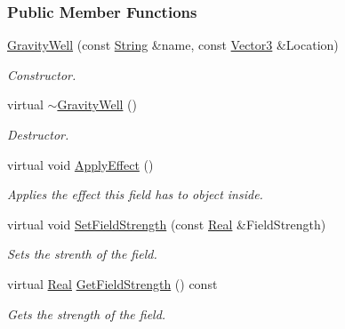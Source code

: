 \subsubsection*{Public Member Functions}
\begin{DoxyCompactItemize}
\item 
\hyperlink{classphys_1_1GravityWell_a628f12b77e5a83a20a51a921d1972e03}{GravityWell} (const \hyperlink{namespacephys_aa03900411993de7fbfec4789bc1d392e}{String} \&name, const \hyperlink{classphys_1_1Vector3}{Vector3} \&Location)
\begin{DoxyCompactList}\small\item\em Constructor. \item\end{DoxyCompactList}\item 
virtual \hyperlink{classphys_1_1GravityWell_aeeeb63ceb3feb1223f8339f73412777d}{$\sim$GravityWell} ()
\begin{DoxyCompactList}\small\item\em Destructor. \item\end{DoxyCompactList}\item 
virtual void \hyperlink{classphys_1_1GravityWell_a944817d495baf9f71b6d33a420eccfde}{ApplyEffect} ()
\begin{DoxyCompactList}\small\item\em Applies the effect this field has to object inside. \item\end{DoxyCompactList}\item 
virtual void \hyperlink{classphys_1_1GravityWell_a2e08c34a70bc57560d77702c40dd8021}{SetFieldStrength} (const \hyperlink{namespacephys_af7eb897198d265b8e868f45240230d5f}{Real} \&FieldStrength)
\begin{DoxyCompactList}\small\item\em Sets the strenth of the field. \item\end{DoxyCompactList}\item 
virtual \hyperlink{namespacephys_af7eb897198d265b8e868f45240230d5f}{Real} \hyperlink{classphys_1_1GravityWell_ad8b5c7e657dbae260a65d48d45c57138}{GetFieldStrength} () const 
\begin{DoxyCompactList}\small\item\em Gets the strength of the field. \item\end{DoxyCompactList}\item 

\end{DoxyCompactItemize}
